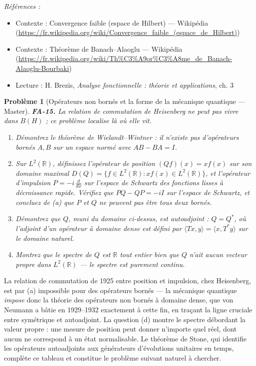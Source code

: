 \documentclass[11pt]{article}
\newtheorem{problem}{Problème}
\newenvironment{refs}{\par\small\noindent\emph{Références :}\begin{itemize}\setlength\itemsep{0pt}}{\end{itemize}\normalsize}
\begin{document}
\begin{refs}
\item Contexte : Convergence faible (espace de Hilbert) --- Wikipédia (\url{https://fr.wikipedia.org/wiki/Convergence_faible_(espace_de_Hilbert)})
\item Contexte : Théorème de Banach--Alaoglu --- Wikipédia (\url{https://fr.wikipedia.org/wiki/Th%C3%A9or%C3%A8me_de_Banach-Alaoglu-Bourbaki})
\item Lecture : H. Brezis, \textit{Analyse fonctionnelle : théorie et applications}, ch. 3
\end{refs}

\bigskip

\begin{problem}[{Opérateurs non bornés et la forme de la mécanique quantique --- Master}]
\textbf{FA-15.} La relation de commutation de Heisenberg ne peut pas vivre dans $ B(H) $ ; ce
problème localise là où elle vit.
\begin{enumerate}
\item[(a)] Démontrez le théorème de Wielandt--Wintner : il n'existe pas d'opérateurs bornés $ A, B $ sur un
espace normé avec $ AB - BA = I $.
\item[(b)] Sur $ L^2(\mathbb{R}) $, définissez l'opérateur de position $ (Qf)(x) = x f(x) $ sur son
domaine maximal $ D(Q) = \{ f \in L^2(\mathbb{R}) : x f(x) \in L^2(\mathbb{R}) \} $, et l'opérateur
d'impulsion $ P = -i\,\frac{d}{dx} $ sur l'espace de Schwartz des fonctions lisses à décroissance
rapide. Vérifiez que $ PQ - QP = -iI $ sur l'espace de Schwartz, et concluez de (a) que $ P $ et
$ Q $ ne peuvent pas être tous deux bornés.
\item[(c)] Démontrez que $ Q $, muni du domaine ci-dessus, est autoadjoint : $ Q = Q^{*} $, où l'adjoint
d'un opérateur à domaine dense est défini par $ \langle Tx, y\rangle = \langle x, T^{*}y\rangle $
sur le domaine naturel.
\item[(d)] Montrez que le spectre de $ Q $ est $\mathbb{R}$ tout entier bien que $ Q $ n'ait aucun vecteur propre
dans $ L^2(\mathbb{R}) $ --- le spectre est purement continu.
\end{enumerate}

\end{problem}

\noindent La relation de commutation de 1925 entre position et impulsion, chez Heisenberg, est
par (a) impossible pour des opérateurs bornés --- la mécanique quantique \textit{impose} donc la théorie des
opérateurs non bornés à domaine dense, que von Neumann a bâtie en 1929--1932 exactement à cette fin, en
traçant la ligne cruciale entre symétrique et autoadjoint. La question (d) montre le spectre débordant la
valeur propre : une mesure de position peut donner n'importe quel réel, dont aucun ne correspond à un
état normalisable. Le théorème de Stone, qui identifie les opérateurs autoadjoints aux générateurs
d'évolutions unitaires en temps, complète ce tableau et constitue le problème suivant naturel à
chercher.
\end{document}
